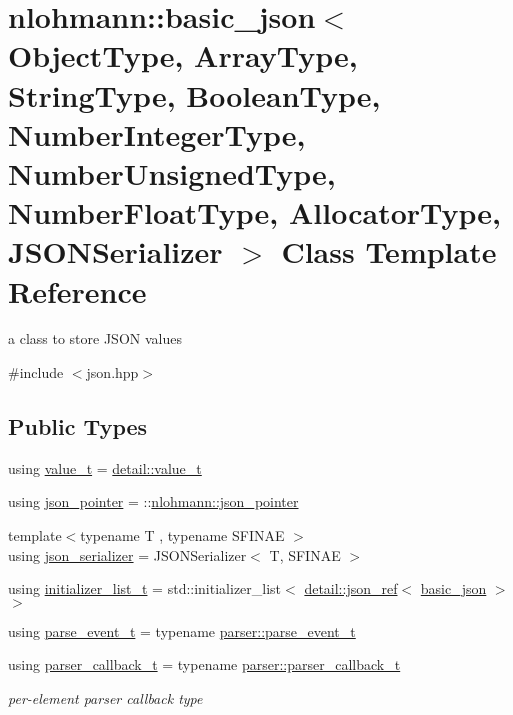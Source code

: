 \hypertarget{classnlohmann_1_1basic__json}{}\section{nlohmann\+:\+:basic\+\_\+json$<$ Object\+Type, Array\+Type, String\+Type, Boolean\+Type, Number\+Integer\+Type, Number\+Unsigned\+Type, Number\+Float\+Type, Allocator\+Type, J\+S\+O\+N\+Serializer $>$ Class Template Reference}
\label{classnlohmann_1_1basic__json}


a class to store J\+S\+ON values  




{\ttfamily \#include $<$json.\+hpp$>$}

\subsection*{Public Types}
\begin{DoxyCompactItemize}
\item 
using \hyperlink{classnlohmann_1_1basic__json_ae8cbef097f7da18a781fc86587de6b90}{value\+\_\+t} = \hyperlink{namespacenlohmann_1_1detail_a90aa5ef615aa8305e9ea20d8a947980f}{detail\+::value\+\_\+t}
\item 
using \hyperlink{classnlohmann_1_1basic__json_a32d3ee58bf01b28d11366f307518bf34}{json\+\_\+pointer} = \+::\hyperlink{classnlohmann_1_1json__pointer}{nlohmann\+::json\+\_\+pointer}
\item 
{\footnotesize template$<$typename T , typename S\+F\+I\+N\+AE $>$ }\\using \hyperlink{classnlohmann_1_1basic__json_a7768841baaaa7a21098a401c932efaff}{json\+\_\+serializer} = J\+S\+O\+N\+Serializer$<$ T, S\+F\+I\+N\+AE $>$
\item 
using \hyperlink{classnlohmann_1_1basic__json_a670f6a0eb3d1e0ffd00c27d35472ccc9}{initializer\+\_\+list\+\_\+t} = std\+::initializer\+\_\+list$<$ \hyperlink{classnlohmann_1_1detail_1_1json__ref}{detail\+::json\+\_\+ref}$<$ \hyperlink{classnlohmann_1_1basic__json}{basic\+\_\+json} $>$$>$
\item 
using \hyperlink{classnlohmann_1_1basic__json_aaceba2e4cf75fc983bb75c78c8742e65}{parse\+\_\+event\+\_\+t} = typename \hyperlink{classnlohmann_1_1detail_1_1parser_a37ac88c864dda495f72cb62776b0bebe}{parser\+::parse\+\_\+event\+\_\+t}
\item 
using \hyperlink{classnlohmann_1_1basic__json_ab4f78c5f9fd25172eeec84482e03f5b7}{parser\+\_\+callback\+\_\+t} = typename \hyperlink{classnlohmann_1_1detail_1_1parser_ad250ad4f2b4af4a497e727c963162ff1}{parser\+::parser\+\_\+callback\+\_\+t}
\begin{DoxyCompactList}\small\item\em per-\/element parser callback type \end{DoxyCompactList}\end{DoxyCompactItemize}
